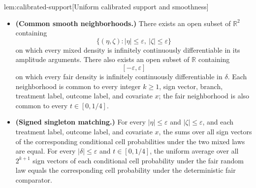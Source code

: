 \documentclass[11pt]{article}
\begin{document}
\begin{lemmav}{lem:calibrated-support}[Uniform calibrated support and smoothness]
\begin{itemize}
\item \textbf{(Common smooth neighborhoods.)}
There exists an open subset of \(\mathbb R^2\) containing
\[
\{(\eta,\zeta):|\eta|\le\varepsilon,\ |\zeta|\le\varepsilon\}
\]
on which every mixed density is infinitely continuously differentiable in its amplitude arguments. There also exists an open subset of \(\mathbb R\) containing
\[
[-\varepsilon,\varepsilon]
\]
on which every fair density is infinitely continuously differentiable in \(\delta\). Each neighborhood is common to every integer \(k\ge1\), sign vector, branch, treatment label, outcome label, and covariate \(x\); the fair neighborhood is also common to every \(t\in[0,1/4]\).

\item \textbf{(Signed singleton matching.)}
For every \(|\eta|\le\varepsilon\) and \(|\zeta|\le\varepsilon\), and each treatment label, outcome label, and covariate \(x\), the sums over all sign vectors of the corresponding conditional cell probabilities under the two mixed laws are equal. For every \(|\delta|\le\varepsilon\) and \(t\in[0,1/4]\), the uniform average over all \(2^{k+1}\) sign vectors of each conditional cell probability under the fair random law equals the corresponding cell probability under the deterministic fair comparator.
\end{itemize}
\end{lemmav}
\end{document}
